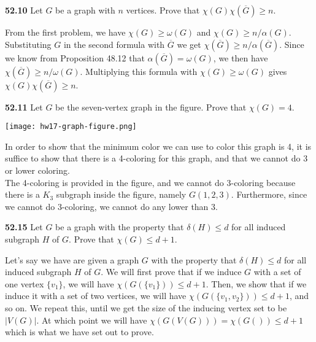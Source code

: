 \documentclass[10pt]{article}
\begin{document}
\pagebreak

\begin{framed}
	\textbf{52.10} Let $G$ be a graph with $n$ vertices. Prove that 
	$\chi(G)\chi(\overline{G}) \geq n$.
\end{framed}

From the first problem, we have $\chi(G) \geq \omega(G)$ and $\chi(G) \geq n/\alpha(G)$.
Substituting $G$ in the second formula with $\overline{G}$ we get $\chi(\overline{G}) \geq n/\alpha(\overline{G})$.
Since we know from Proposition 48.12 that $\alpha(\overline{G}) = \omega(G)$, we then have 
$\chi(\overline{G}) \geq n/\omega(G)$. Multiplying this formula with $\chi(G) \geq \omega(G)$ gives 
$\chi(G)\chi(\overline{G}) \geq n$.

\pagebreak

\begin{framed}
	\textbf{52.11} Let $G$ be the seven-vertex graph in the figure.
	Prove that $\chi(G) = 4$.

	\texttt{[image: hw17-graph-figure.png]}
\end{framed}

In order to show that the minimum color we can use to color this graph is 4, it is suffice to 
show that there is a 4-coloring for this graph, and that we cannot do 3 or lower coloring.\\

The 4-coloring is provided in the figure, and we cannot do 3-coloring because there is a $K_3$
subgraph inside the figure, namely $G({1, 2, 3})$. Furthermore, since we cannot do 3-coloring, 
we cannot do any lower than 3.

\pagebreak

\begin{framed}
	\textbf{52.15} Let $G$ be a graph with the property that $\delta(H) \leq d$
	for all induced subgraph $H$ of $G$. Prove that $\chi(G) \leq d+1$.
\end{framed}

Let's say we have are given a graph $G$ with the property that $\delta(H) \leq d$
for all induced subgraph $H$ of $G$. We will first prove that if we induce $G$ with 
a set of one vertex $\{v_1\}$, we will have $\chi(G(\{v_1\})) \leq d+1$.
Then, we show that if we induce it with a set of two vertices, we will have $\chi(G(\{v_1, v_2\})) \leq d+1$, 
and so on.
We repeat this, until we get the size of the inducing vertex set to be $|V(G)|$. At which point 
we will have $\chi(G(V(G))) = \chi(G()) \leq d+1$ which is what we have set out to prove.\\
\end{document}
